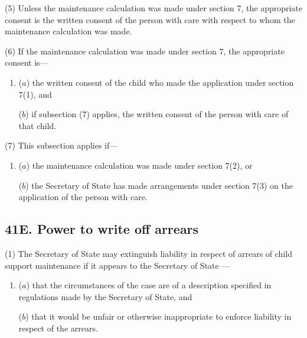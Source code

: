 \documentclass[12pt,a4paper]{article}
\begin{document}
(5)
Unless the maintenance calculation was made under section 7, the appropriate consent is the written consent of the person with care with respect to whom the maintenance calculation was made.

(6)
If the maintenance calculation was made under section 7, the appropriate consent is---
\begin{enumerate}\item[]
($a$) the written consent of the child who made the application under section 7(1), and

($b$) if subsection (7) applies, the written consent of the person with care of that child.
\end{enumerate}

(7) This subsection applies if---
\begin{enumerate}\item[]
($a$) the maintenance calculation was made under section 7(2), or

($b$) the Secretary of State has made arrangements under section 7(3) on the application of the person with care.
\end{enumerate}


\subsection{41E. Power to write off arrears}

(1) The 
Secretary of State %
may extinguish liability in respect of arrears of child support maintenance if it appears to 
the Secretary of State%
---
\begin{enumerate}\item[]
($a$) that the circumstances of the case are of a description specified in regulations made by the Secretary of State, and

($b$) that it would be unfair or otherwise inappropriate to enforce liability in
respect of the arrears.
\end{enumerate}
\end{document}
